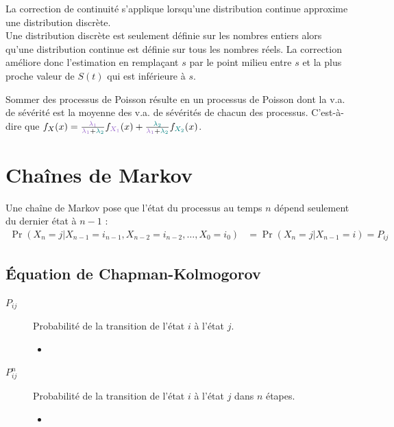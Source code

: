 \documentclass[10pt, french]{article}
\begin{document}
\begin{multicols*}{2}
\begin{definitionNOHFILLpropos}
La correction de continuité s'applique lorsqu'une distribution continue approxime une distribution discrète. \\

Une distribution discrète est seulement définie sur les nombres entiers alors qu'une distribution continue est définie sur tous les nombres réels. La correction améliore donc l'estimation en remplaçant $s$ par le point milieu entre $s$ et la plus proche valeur de $S(t)$ qui est inférieure à $s$.
\end{definitionNOHFILLpropos}

Sommer des processus de Poisson résulte en un processus de Poisson dont la v.a. de sévérité est la moyenne des v.a. de sévérités de chacun des processus. C'est-à-dire que $f_{X}(x) = \frac{\textcolor{amethyst}{\lambda_{1}}}{\textcolor{amethyst}{\lambda_{1}} + \textcolor{teal}{\lambda_{2}}} f_{\textcolor{amethyst}{X_{1}}}(x) + \frac{\textcolor{teal}{\lambda_{2}}}{\textcolor{amethyst}{\lambda_{1}} + \textcolor{teal}{\lambda_{2}}} f_{\textcolor{teal}{X_{2}}}(x)$.



\pagebreak
\section{Chaînes de Markov}
Une chaîne de Markov pose que l'état du processus au temps $n$ dépend seulement du dernier état à $n	-	1$ : 
\begin{align*}
	\Pr(X_{n}	=	j | X_{n - 1}	=	i_{n - 1}, X_{n - 2} = i_{n - 2}, \dots, X_{0}	=	i_{0})
	&=	\Pr(X_{n}	=	j | X_{n - 1}	=	i)
	=	P_{ij}
\end{align*}

\subsection{Équation de Chapman-Kolmogorov}
\begin{distributions}[Notation]
\begin{description}
	\item[$P_{ij}$]	Probabilité de la transition de l'état $i$ à l'état $j$.
		\begin{itemize}
		\item	{}
		\end{itemize}
	\item[$P_{ij}^{n}$]	Probabilité de la transition de l'état $i$ à l'état $j$ dans $n$ étapes.
		\begin{itemize}
		\item	{}
		\end{itemize}
\end{description}
\end{distributions}


\end{multicols*}
\end{document}
